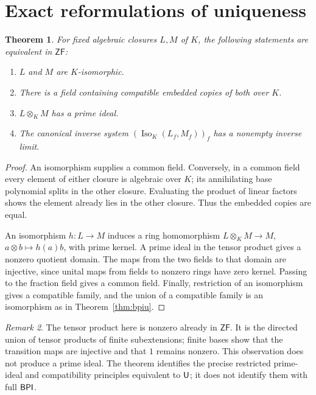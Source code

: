 \documentclass[11pt,a4paper]{article}
\newtheorem{theorem}{Theorem}[section]
\theoremstyle{definition}\newtheorem{definition}[theorem]{Definition}
\theoremstyle{remark}\newtheorem{remark}[theorem]{Remark}
\newcommand{\ZF}{\mathsf{ZF}}\newcommand{\ZFA}{\mathsf{ZFA}}
\DeclareMathOperator{\Iso}{Iso}\DeclareMathOperator{\Aut}{Aut}
\begin{document}
\section{Exact reformulations of uniqueness}
\begin{theorem}\label{thm:tensor}
For fixed algebraic closures $L,M$ of $K$, the following statements are equivalent in $\ZF$:
\begin{enumerate}
\item $L$ and $M$ are $K$-isomorphic.
\item There is a field containing compatible embedded copies of both over $K$.
\item $L\otimes_K M$ has a prime ideal.
\item The canonical inverse system $(\Iso_K(L_f,M_f))_f$ has a nonempty inverse limit.
\end{enumerate}
\end{theorem}
\begin{proof}
An isomorphism supplies a common field. Conversely, in a common field every element of either closure is algebraic over $K$; its annihilating base polynomial splits in the other closure. Evaluating the product of linear factors shows the element already lies in the other closure. Thus the embedded copies are equal.

An isomorphism $h:L\to M$ induces a ring homomorphism $L\otimes_K M\to M$, $a\otimes b\mapsto h(a)b$, with prime kernel. A prime ideal in the tensor product gives a nonzero quotient domain. The maps from the two fields to that domain are injective, since unital maps from fields to nonzero rings have zero kernel. Passing to the fraction field gives a common field. Finally, restriction of an isomorphism gives a compatible family, and the union of a compatible family is an isomorphism as in Theorem~\ref{thm:bpiu}.
\end{proof}

\begin{remark}
The tensor product here is nonzero already in $\ZF$. It is the directed union of tensor products of finite subextensions; finite bases show that the transition maps are injective and that $1$ remains nonzero. This observation does not produce a prime ideal. The theorem identifies the precise restricted prime-ideal and compatibility principles equivalent to $\mathsf U$; it does not identify them with full $\mathsf{BPI}$.
\end{remark}
\end{document}
